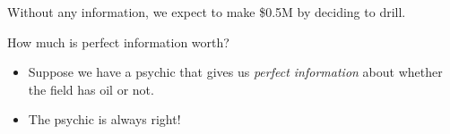\documentclass{beamer}\usepackage[]{graphicx}\usepackage[]{color}
\begin{document}
\begin{darkframes}
\begin{frame}
\begin{center}
        Without any information, we expect to make \$0.5M by deciding to drill.
      \end{center}
    \end{frame}

    \begin{frame}{How much is perfect information worth?}
      \begin{itemize}[<+->]
        \item Suppose we have a psychic that gives us \emph{perfect information} about whether the field has oil or not.
        \item The psychic is always right!
      \end{itemize}
    \end{frame}

    \begin{frame}
      


\end{frame}
\end{darkframes}
\end{document}
